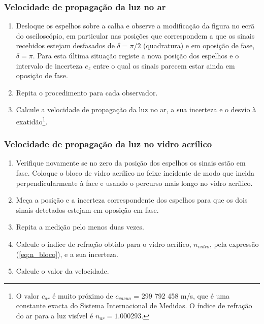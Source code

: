 \documentclass[a4paper,12pt]{article}      %
\begin{document}
\subsubsection{\sf Velocidade de propagação da luz no ar}
\begin{enumerate}
\item Desloque os espelhos sobre a calha e observe a modificação da figura no ecrã do 
osciloscópio, em particular nas posições que correspondem a que os sinais recebidos estejam 
desfasados de $\delta=\pi/2$ (quadratura) e em oposição de fase, $\delta=\pi$. Para esta última situação registe a 
nova posição dos espelhos e o intervalo de incerteza $e_z$  entre o qual os sinais parecem estar ainda em 
oposição de fase. 
\item Repita o procedimento para cada observador. 
\item Calcule a velocidade de propagação da luz no ar, a sua incerteza e o desvio à exatidão\footnote{O valor $c_{ar}$ é muito próximo de $c_{vacuo}$ = 299 792 458 m/s, que é uma constante exacta do Sistema Internacional de Medidas. O índice de refração do ar para a luz visível é $n_{ar}=1.000293$.}. 
\end{enumerate}

\subsubsection{\sf Velocidade de propagação da luz no vidro acrílico}
\begin{enumerate}
\item Verifique novamente se no zero da posição dos espelhos os sinais estão em fase. Coloque o bloco de vidro 
acrílico no feixe incidente de modo que incida perpendicularmente à face e usando o percurso 
mais longo no vidro acrílico. 
\item Meça a posição e a incerteza correspondente dos espelhos para que os dois sinais detetados estejam em oposição em fase. 
\item Repita a medição pelo menos 
duas vezes.
\item Calcule o índice de refração obtido para o vidro acrílico, $n_{vidro}$, pela expressão (\ref{eq:n_bloco}),  e a sua incerteza. 
\item Calcule o valor da velocidade.
\end{enumerate}
\end{document}
